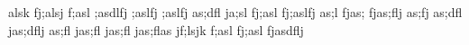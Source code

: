 alsk fj;alsj f;asl ;asdlfj ;aslfj ;aslfj as;dfl
ja;sl fj;asl fj;aslfj as;l fjas; fjas;flj as;fj
as;dfl jas;dflj as;fl jas;fl jas;fl jas;flas
jf;lsjk f;asl fj;asl fjasdflj
